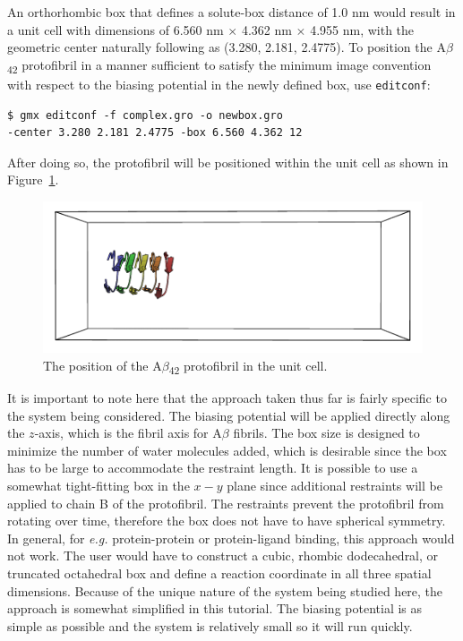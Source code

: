 \documentclass[9pt,tutorial]{livecoms}
\begin{document}
An orthorhombic box that defines a solute-box distance of 1.0 nm would result in a unit cell with dimensions of 6.560 nm $\times$ 4.362 nm $\times$ 4.955 nm, with the geometric center naturally following as (3.280, 2.181, 2.4775). To position the A$\beta$\textsubscript{42} protofibril in a manner sufficient to satisfy the minimum image convention with respect to the biasing potential in the newly defined box, use \texttt{editconf}:

\begin{verbatim}
$ gmx editconf -f complex.gro -o newbox.gro
-center 3.280 2.181 2.4775 -box 6.560 4.362 12
\end{verbatim}

After doing so, the protofibril will be positioned within the unit cell as shown in Figure~\ref{umbrella_box_fig}.

\begin{figure}[H]
\centering
\includegraphics{umbrella_protofibril_box}
\caption{The position of the A$\beta$\textsubscript{42} protofibril in the unit cell.}
\label{umbrella_box_fig}
\end{figure}

It is important to note here that the approach taken thus far is fairly specific to the system being considered. The biasing potential will be applied directly along the $z$-axis, which is the fibril axis for A$\beta$ fibrils. The box size is designed to minimize the number of water molecules added, which is desirable since the box has to be large to accommodate the restraint length. It is possible to use a somewhat tight-fitting box in the $x-y$ plane since additional restraints will be applied to chain B of the protofibril. The restraints prevent the protofibril from rotating over time, therefore the box does not have to have spherical symmetry. In general, for {\em e.g.} protein-protein or protein-ligand binding, this approach would not work. The user would have to construct a cubic, rhombic dodecahedral, or truncated octahedral box and define a reaction coordinate in all three spatial dimensions. Because of the unique nature of the system being studied here, the approach is somewhat simplified in this tutorial. The biasing potential is as simple as possible and the system is relatively small so it will run quickly.
\end{document}
